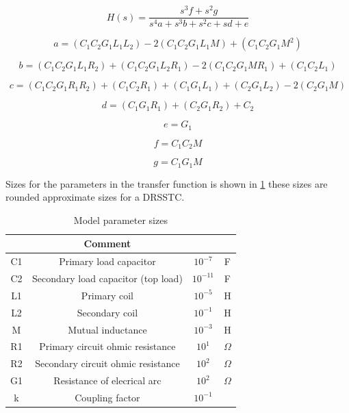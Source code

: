 \newpage

\begin{equation} \label{eq:4}
    H(s) = \frac{s^3 f + s^2 g}{s^4 a + s^3 b + s^2 c + s d + e}
\end{equation}

\begin{equation} \label{eq:4_1}
    a = (C_1 C_2 G_1 L_1 L_2)-2 (C_1 C_2 G_1 L_1 M)+(C_1 C_2 G_1 M^2)
\end{equation}

\begin{equation} \label{eq:4_2}
    b = (C_1 C_2 G_1 L_1 R_2)+(C_1 C_2 G_1 L_2 R_1)-2 (C_1 C_2 G_1 M R_1)+(C_1 C_2 L_1)
\end{equation}

\begin{equation} \label{eq:4_3}
    c = (C_1 C_2 G_1 R_1 R_2)+(C_1 C_2 R_1)+(C_1 G_1 L_1)+(C_2 G_1 L_2)-2 (C_2 G_1 M)
\end{equation}

\begin{equation} \label{eq:4_4}
    d = (C_1 G_1 R_1)+(C_2 G_1 R_2)+C_2
\end{equation}

\begin{equation} \label{eq:4_5}
    e = G_1
\end{equation}

\begin{equation} \label{eq:4_6}
    f = C_1 C_2 M
\end{equation}

\begin{equation} \label{eq:4_7}
    g = C_1 G_1 M
\end{equation}

Sizes for the parameters in the transfer function is shown in \cref{tab:mod_params} these sizes are rounded approximate sizes for a DRSSTC.

\begin{table}[]
    \centering
    \begin{tabular}{c|c|c|c}
         & Comment &  &\\ \hline
        C1 & Primary load capacitor                 & $10^{-7}$ & F \\
        C2 & Secondary load capacitor (top load)    & $10^{-11}$& F \\
        L1 & Primary coil                           & $10^{-5}$ & H \\
        L2 & Secondary coil                         & $10^{-1}$ & H \\
        M  & Mutual inductance                      & $10^{-3}$ & H \\
        R1 & Primary circuit ohmic resistance       & $10^{1}$  & $\Omega$ \\
        R2 & Secondary circuit ohmic resistance     & $10^{2}$  & $\Omega$ \\
        G1 & Resistance of elecrical arc            & $10^{2}$  & $\Omega$ \\ %
        k  & Coupling factor                        & $10^{-1}$ & 
    \end{tabular}
    \caption{Model parameter sizes}
    \label{tab:mod_params}
\end{table}

